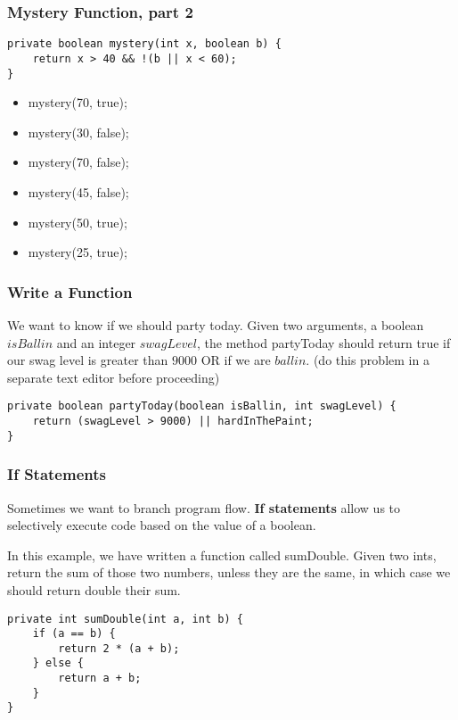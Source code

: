 \documentclass{beamer}
\begin{document}
\begin{frame}[fragile]
\frametitle{Mystery Function, part 2}
\begin{lstlisting}
private boolean mystery(int x, boolean b) {
    return x > 40 && !(b || x < 60);
}
\end{lstlisting}
\begin{itemize}
\item<2->mystery(70, true);
\item<3->mystery(30, false);
\item<4->mystery(70, false);
\item<5->mystery(45, false);
\item<6->mystery(50, true);
\item<7->mystery(25, true);
\end{itemize}
\end{frame}

\begin{frame}[fragile]
\frametitle{Write a Function}
We want to know if we should party today. Given two arguments, a boolean $isBallin$ and an integer $swagLevel$, the method partyToday should return true if our swag level is greater than $9000$ OR if we are $ballin$.
\pause
(do this problem in a separate text editor before proceeding)
\pause
\begin{lstlisting}
private boolean partyToday(boolean isBallin, int swagLevel) {
    return (swagLevel > 9000) || hardInThePaint;
}
\end{lstlisting}
\end{frame}

\begin{frame}[fragile]
\frametitle{If Statements}
Sometimes we want to branch program flow. \textbf{If statements} allow us to selectively execute code based on the value of a boolean.
\pause

In this example, we have written a function called sumDouble. Given two ints, return the sum of those two numbers, unless they are the same, in which case we should return double their sum.
\pause
\begin{lstlisting}
private int sumDouble(int a, int b) {
    if (a == b) {
        return 2 * (a + b);
    } else {
        return a + b;
    }
}
\end{lstlisting}
\end{frame}
\end{document}
